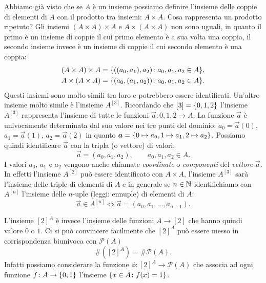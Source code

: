 Abbiamo già visto che se $A$ è un insieme possiamo definire l'insieme 
delle coppie di elementi di $A$ con il prodotto tra insiemi: $A\times A$. 
Cosa rappresenta un prodotto ripetuto?
Gli insiemi $(A\times A)\times A$ e $A\times(A\times A)$ non sono 
uguali, in quanto il primo è un insieme di coppie il cui primo elemento 
è a sua volta una coppia, il secondo insieme invece è un insieme di coppie 
il cui secondo elemento è una coppia:
\begin{gather*}
  (A\times A)\times A = {\left\{ ((a_0,a_1),a_2)\colon a_0,a_1,a_2\in A \right\}},
  \\
  A \times (A\times A) = {\left\{ (a_0,(a_1,a_2))\colon a_0,a_1,a_2\in A \right\}}.
\end{gather*}
Questi insiemi sono molto simili tra loro e potrebbero essere identificati.
Un'altro insieme molto simile è l'insieme $A^{[3]}$.  
Ricordando che $[3] = {\left\{ 0,1,2 \right\}}$ l'insieme 
$A^{[3]}$ rappresenta l'insieme di tutte le funzioni $\vec a\colon {0,1,2}\to A$.
La funzione $\vec a$ è univocamente determinata dal suo valore nei 
tre punti del dominio: $a_0 = \vec a(0)$, $a_1=\vec a(1)$, $a_2=\vec a(2)$
in quanto $\boldsymbol a = {\left\{ 0\mapsto a_0, 1\mapsto a_1, 2\mapsto a_2 \right\}}$.
Possiamo quindi identificare $\vec a$ con la tripla (o vettore) di valori:
\[
  \vec a = (a_0, a_1, a_2), \qquad a_0,a_1,a_2 \in A.  
\]
I valori $a_0$, $a_1$ e $a_2$ vengono anche chiamate \emph{coordinate}
o \emph{componenti} del \emph{vettore} $\vec a$.
%
%
%
%
In effetti l'insieme $A^{[2]}$ può essere identificato con $A\times A$, l'insieme 
$A^{[3]}$ sarà l'insieme delle triple di elementi di $A$ e in generale se $n\in{\mathbb N}$ 
identifichiamo con $A^{[n]}$ l'insieme delle $n$-uple (leggi: ennuple) di elementi 
%
di $A$:
\[
   \vec a \in A^{[n]} \iff 
   \vec a = (a_0, a_1, \dots, a_{n-1}).  
\]


L'insieme $[2]^A$ è invece l'insieme delle funzioni $A\to [2]$ che hanno 
quindi valore $0$ o $1$. 
Ci si può convincere facilmente che $[2]^A$ può essere messo in corrispondenza 
biunivoca con $\mathcal P(A)$
\[
    \# ([2]^A) = \# \mathcal P(A).
\]
Infatti possiamo considerare la funzione $\phi\colon [2]^A \to \mathcal P(A)$
che associa ad ogni funzione $f\colon A\to {\left\{ 0,1 \right\}}$
l'insieme ${\left\{ x\in A \colon f(x)=1 \right\}}$.

